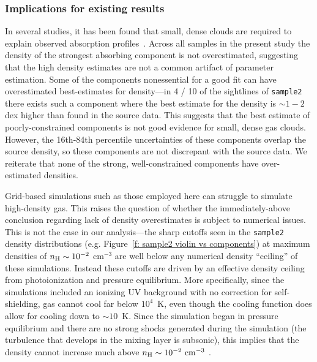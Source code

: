 \documentclass[fleqn,usenatbib]{mnras}
\begin{document}
\subsubsection{Implications for existing results}
\label{s: discussion -- cloud structure -- implications}

In several studies, it has been found that small, dense clouds are required to explain observed absorption profiles~\citep{Rigby2002, Narayanan2008, Muzahid2018}.
Across all samples in the present study the density of the strongest absorbing component is not overestimated,
suggesting that the high density estimates are not a common artifact of parameter estimation.
Some of the components nonessential for a good fit can have overestimated best-estimates for density---in 4 / 10 of the sightlines of \texttt{sample2} there exists such a component where the best estimate for the density is $\sim 1-2$ dex higher than found in the source data.
This suggests that the best estimate of poorly-constrained components is not good evidence for small, dense gas clouds.
However, the 16th-84th percentile uncertainties of these components overlap the source density,
so these components are not discrepant with the source data.
We reiterate that none of the strong, well-constrained components have over-estimated densities.

Grid-based simulations such as those employed here can struggle to simulate high-density gas.
This raises the question of whether the immediately-above conclusion regarding lack of density overestimates is subject to numerical issues.
This is not the case in our analysis---the sharp cutoffs seen in the \texttt{sample2} density distributions (e.g. Figure~\ref{f: sample2 violin vs components})  at maximum densities of $n_{\rm H} \sim 10^{-2}$ cm$^{-3}$ are well below any numerical density ``ceiling'' of these simulations.
Instead these cutoffs are driven by an effective density ceiling from photoionization and pressure equilibrium.
More specifically, since the simulations included an ionizing UV background with no correction for self-shielding, gas cannot cool far below $10^4$~K, even though the cooling function does allow for cooling down to $\sim 10$~K.
Since the simulation began in pressure equilibrium and there are no strong shocks generated during the simulation (the turbulence that develops in the mixing layer is subsonic), this implies that the density cannot increase much above $n_{\rm H}\sim 10^{-2}~{\rm cm^{-3}}$ \citep[see][]{mandelker2020Instability}.
\end{document}
